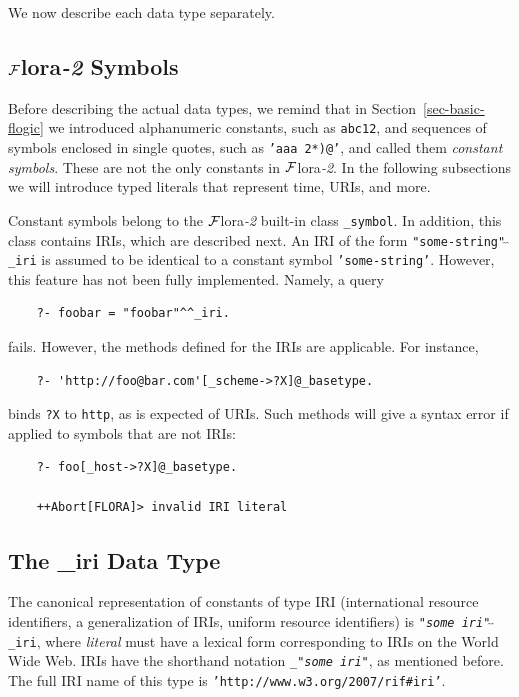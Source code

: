 \documentclass[11pt]{article}
\newcommand{\FLORA}{{\mbox{\sc ${\cal F}${lora}\rm\emph{-2}}}\xspace}
\begin{document}
We now describe each data type separately.

\subsection{\FLORA Symbols}

Before describing the actual data types, we remind that
in Section~\ref{sec-basic-flogic} we introduced
alphanumeric constants, such as {\tt abc12}, and sequences of symbols
enclosed in single quotes, such as {\tt 'aaa 2*)@'},  and called them
\emph{constant symbols}. These are not the only constants in \FLORA.
In the following subsections we will introduce typed literals that
represent time, URIs, and more. 

Constant symbols belong to the \FLORA built-in class {\tt \_symbol}.
In addition, this class contains IRIs, which are described next.
An IRI of the form {\tt "some-string"$\hat{~}\hat{~}$\_iri} is assumed to
be identical to
a constant symbol {\tt 'some-string'}. However, this feature has not been
fully implemented. Namely, a query
\begin{verbatim}
    ?- foobar = "foobar"^^_iri.
\end{verbatim}
fails. However, the methods defined for the IRIs are applicable. For
instance,
\begin{verbatim}
    ?- 'http://foo@bar.com'[_scheme->?X]@_basetype.
\end{verbatim}
binds {\tt ?X} to {\tt http}, as is expected of URIs.
Such methods will give a syntax error if applied to symbols that are not
IRIs:
\begin{verbatim}
    ?- foo[_host->?X]@_basetype.

    ++Abort[FLORA]> invalid IRI literal
\end{verbatim}


\subsection{The \_iri Data Type}\label{sec-uri}

The canonical representation of constants of type IRI (international
resource identifiers, a generalization of IRIs, uniform resource
identifiers) is
{\tt "\emph{some iri}"$\hat{~}\hat{~}$\_iri}, where \emph{literal} must have
a lexical form corresponding to IRIs on the World Wide Web. IRIs have the shorthand notation
{\tt \_"\emph{some iri}"}, as mentioned before. The full IRI name of this
type is {\tt 'http://www.w3.org/2007/rif\#iri'}. 
\end{document}
